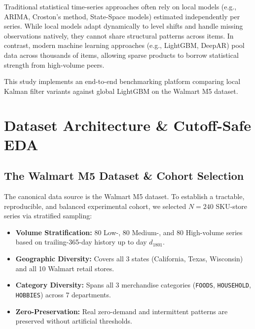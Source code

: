 \documentclass[11pt,a4paper]{article}
\begin{document}
Traditional statistical time-series approaches often rely on local models (e.g., ARIMA, Croston's method, State-Space models) estimated independently per series. While local models adapt dynamically to level shifts and handle missing observations natively, they cannot share structural patterns across items. In contrast, modern machine learning approaches (e.g., LightGBM, DeepAR) pool data across thousands of items, allowing sparse products to borrow statistical strength from high-volume peers.

This study implements an end-to-end benchmarking platform comparing local Kalman filter variants against global LightGBM on the Walmart M5 dataset.

\section{Dataset Architecture \& Cutoff-Safe EDA}

\subsection{The Walmart M5 Dataset \& Cohort Selection}
The canonical data source is the Walmart M5 dataset. To establish a tractable, reproducible, and balanced experimental cohort, we selected $N = 240$ SKU-store series via stratified sampling:
\begin{itemize}
    \item \textbf{Volume Stratification:} 80 Low-, 80 Medium-, and 80 High-volume series based on trailing-365-day history up to day $d_{1801}$.
    \item \textbf{Geographic Diversity:} Covers all 3 states (California, Texas, Wisconsin) and all 10 Walmart retail stores.
    \item \textbf{Category Diversity:} Spans all 3 merchandise categories (\texttt{FOODS}, \texttt{HOUSEHOLD}, \texttt{HOBBIES}) across 7 departments.
    \item \textbf{Zero-Preservation:} Real zero-demand and intermittent patterns are preserved without artificial thresholds.
\end{itemize}
\end{document}
